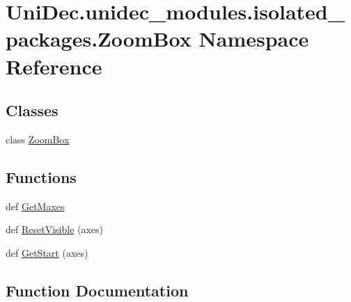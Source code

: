 \hypertarget{namespace_uni_dec_1_1unidec__modules_1_1isolated__packages_1_1_zoom_box}{}\section{Uni\+Dec.\+unidec\+\_\+modules.\+isolated\+\_\+packages.\+Zoom\+Box Namespace Reference}
\label{namespace_uni_dec_1_1unidec__modules_1_1isolated__packages_1_1_zoom_box}
\subsection*{Classes}
\begin{DoxyCompactItemize}
\item 
class \hyperlink{class_uni_dec_1_1unidec__modules_1_1isolated__packages_1_1_zoom_box_1_1_zoom_box}{Zoom\+Box}
\end{DoxyCompactItemize}
\subsection*{Functions}
\begin{DoxyCompactItemize}
\item 
def \hyperlink{namespace_uni_dec_1_1unidec__modules_1_1isolated__packages_1_1_zoom_box_a6b7c999cd9ff0904c116370f4dff9c49}{Get\+Maxes}
\item 
def \hyperlink{namespace_uni_dec_1_1unidec__modules_1_1isolated__packages_1_1_zoom_box_ad433ec5932409b1ed3b02dc8c6b40848}{Reset\+Visible} (axes)
\item 
def \hyperlink{namespace_uni_dec_1_1unidec__modules_1_1isolated__packages_1_1_zoom_box_a083629b64648287498f5c0b686549b2b}{Get\+Start} (axes)
\end{DoxyCompactItemize}


\subsection{Function Documentation}
\hypertarget{namespace_uni_dec_1_1unidec__modules_1_1isolated__packages_1_1_zoom_box_a6b7c999cd9ff0904c116370f4dff9c49}{}
